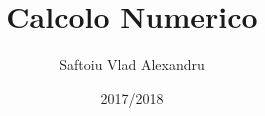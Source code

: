 \documentclass[article, table, xcdraw]{article}
\title{Calcolo Numerico}
\date{2017/2018}
\author{Saftoiu Vlad Alexandru}
\begin{document}
	
	\newcommand{\TODO}[1][]{
		\begin{shaded*} 
			da fare \ifthenelse{\isempty{#1}}{ }{ (: #1 ) }
		\end{shaded*}
	}
	
	\newcommand{\fek}[1]{
		\begin{equation*}
			#1
		\end{equation*}
	}

	\newcommand{\PP}[1][]{
		\ifthenelse{ \isempty{#1} }{ \\[10pt] }{ \\[#1pt] }
	}

	\maketitle
	\newpage

	\tableofcontents
	\newpage
	
	
	
	
	
	
	
	
\end{document}
